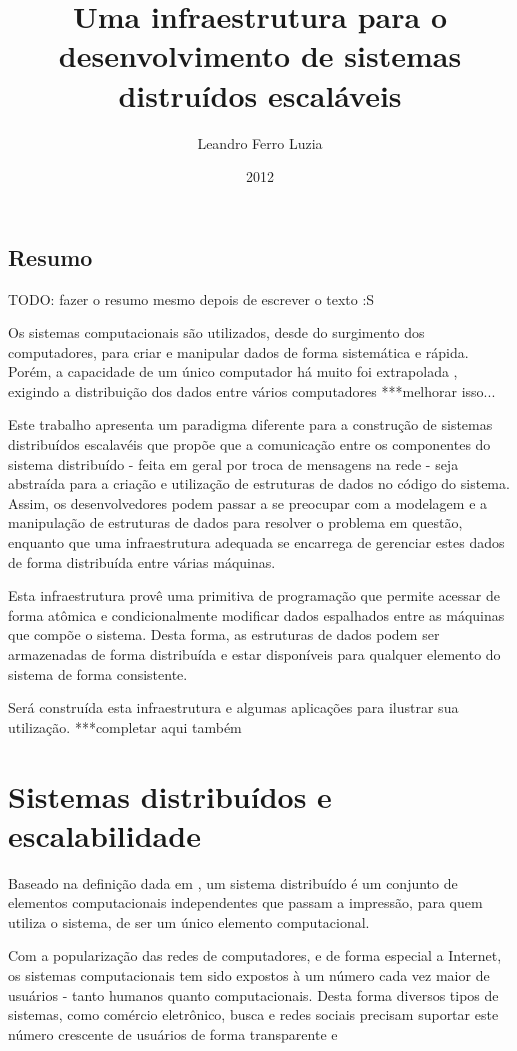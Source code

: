 \documentclass[a4paper,12pt]{report}
\title{Uma infraestrutura para o desenvolvimento de sistemas distruídos escaláveis}
\author{Leandro Ferro Luzia}
\date{2012}
\begin{document}
\pagestyle{headings}
\maketitle
\section*{Resumo}
TODO: fazer o resumo mesmo depois de escrever o texto :S

Os sistemas computacionais são utilizados, desde do surgimento dos computadores, para criar e manipular dados de forma sistemática e rápida. Porém, a capacidade de um único computador há muito foi extrapolada , exigindo a distribuição dos dados entre vários computadores ***melhorar isso...

Este trabalho apresenta um paradigma diferente para a construção de sistemas distribuídos escalavéis que propõe que a comunicação entre os componentes do sistema distribuído - feita em geral por troca de mensagens na rede - seja abstraída para a criação e utilização de estruturas de dados no código do sistema. Assim, os desenvolvedores podem passar a se preocupar com a modelagem e a manipulação de estruturas de dados para resolver o problema em questão, enquanto que uma infraestrutura adequada se encarrega de gerenciar estes dados de forma distribuída entre várias máquinas.

Esta infraestrutura provê uma primitiva de programação que permite acessar de forma atômica e condicionalmente modificar dados espalhados entre as máquinas que compõe o sistema. Desta forma, as estruturas de dados podem ser armazenadas de forma distribuída e estar disponíveis para qualquer elemento do sistema de forma consistente.

Será construída esta infraestrutura e algumas aplicações para ilustrar sua utilização. ***completar aqui também
\tableofcontents
\listoftables
\listoffigures
\chapter{Sistemas distribuídos e escalabilidade}
Baseado na definição dada em \cite{ds-tanenbaum}, um sistema distribuído é um conjunto de elementos computacionais independentes que passam a impressão, para quem utiliza o sistema, de ser um único elemento computacional.

Com a popularização das redes de computadores, e de forma especial a Internet, os sistemas computacionais tem sido expostos à um número cada vez maior de usuários - tanto humanos quanto computacionais. Desta forma diversos tipos de sistemas, como comércio eletrônico, busca e redes sociais precisam suportar este número crescente de usuários de forma transparente e 
\end{document}
